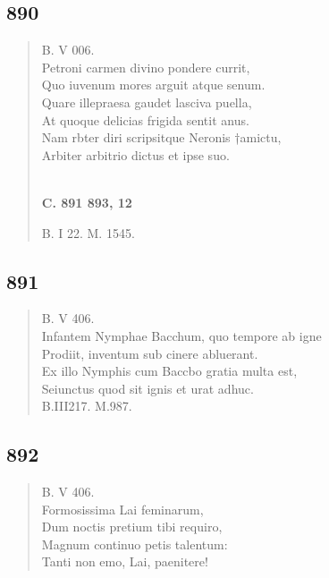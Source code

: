 \documentclass[11pt, a4paper]{report}
\begin{document}
            \subsection*{890}
      \begin{verse}
      B. V 006. \\ Petroni carmen divino pondere currit, \\ Quo iuvenum mores arguit atque senum. \\ Quare illepraesa gaudet lasciva puella, \\ At quoque delicias frigida sentit anus. \\ Nam rbter diri scripsitque Neronis †amictu, \\ Arbiter arbitrio dictus et ipse suo. \\ 
        ﻿\pagebreak 
     \marginpar{[334]} \begin{center} \textbf{C. 891 893, 12} \end{center}B. I 22. M. 1545. \\ 
      \end{verse}
  
            \subsection*{891}
      \begin{verse}
      B. V 406. \\ Infantem Nymphae Bacchum, quo tempore ab igne \\ Prodiit, inventum sub cinere abluerant. \\ Ex illo Nymphis cum Baccbo gratia multa est, \\ Seiunctus quod sit ignis et urat adhuc. \\ B.III217. M.987. \\ 
      \end{verse}
  
            \subsection*{892}
      \begin{verse}
      B. V 406. \\ Formosissima Lai feminarum, \\ Dum noctis pretium tibi requiro, \\ Magnum continuo petis talentum: \\ Tanti non emo, Lai, paenitere! \\ 
      \end{verse}
  
\end{document}
